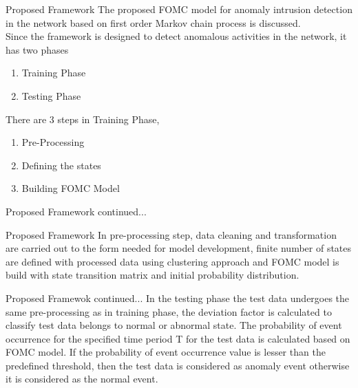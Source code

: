\documentclass{beamer}
\begin{document}
\begin{frame}{Proposed Framework}
The proposed FOMC model for anomaly intrusion detection in the network based on first order Markov chain process is discussed.\\
Since the framework is designed to detect anomalous activities in the network, it has two phases
\begin{enumerate}
    \item Training Phase
    \item Testing Phase
\end{enumerate}
There are 3 steps in Training Phase,
\begin{enumerate}
    \item Pre-Processing
    \item Defining the states
    \item Building FOMC Model
\end{enumerate}
\end{frame}

\begin{frame}{Proposed Framework continued...}
\begin{block}{Proposed Framework}
In pre-processing step, data cleaning and transformation are carried out to the form needed for model development, finite number of states are defined with processed data using clustering approach and FOMC model is build with state transition matrix and initial probability distribution.\\
\end{block}
\begin{block}{Proposed Framewok continued...}
In the testing phase the test data undergoes the same pre-processing as in training phase, the deviation factor is calculated to classify test data belongs to normal or abnormal state. The probability of event occurrence for the specified time period T for the test data is calculated based on FOMC model. If the probability of event occurrence value is lesser than the predefined threshold, then the test data is considered as anomaly event otherwise it is considered as the normal event.
\end{block}

\end{frame}
\end{document}
